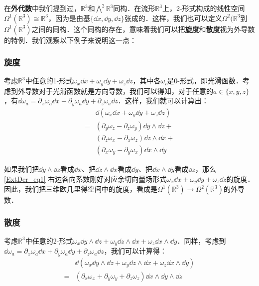 在\textbf{外代数}中我们提到过，$\mathbb{R}^3$和$\bigwedge^2\mathbb{R}^3$同构．在流形$\mathbb{R}^3$上，2-形式构成的线性空间$\Omega^1(\mathbb{R}^3)\cong\mathbb{R}^3$，因为是由基$\{\dd x, \dd y, \dd z\}$张成的．这样，我们也可以定义$\Omega^2(\mathbb{R}^3$到$\Omega^1(\mathbb{R}^3)$之间的同构．这个同构的存在，意味着我们可以把\textbf{旋度}和\textbf{散度}视为外导数的特例．我们观察以下例子来说明这一点：

\subsubsection{旋度}

考虑$\mathbb{R}^3$中任意的1-形式$\omega_x\dd x+\omega_y\dd y+\omega_z\dd z$，其中各$\omega_i$是0-形式，即光滑函数．考虑到外导数对于光滑函数就是方向导数，我们可以得知，对于任意的$a\in\{x,y,z\}$，有$\dd\omega_a=\partial_x\omega_a\dd x+\partial_y\omega_a\dd y+\partial_z\omega_a\dd z$．这样，我们就可以计算出：
\begin{equation}\label{ExtDer_eq1}
\begin{aligned}
&\dd(\omega_x\dd x+\omega_y\dd y+\omega_z\dd z)\\=&(\partial_y\omega_z-\partial_z\omega_y)\dd y\wedge\dd z+\\&(\partial_z\omega_x-\partial_x\omega_z)\dd z\wedge\dd x+\\&(\partial_x\omega_y-\partial_y\omega_x)\dd x\wedge\dd y
\end{aligned}
\end{equation}

如果我们把$\dd y\wedge\dd z$看成$\dd x$、把$\dd z\wedge\dd x$看成$\dd y$、把$\dd x\wedge\dd y$看成$\dd z$，那么\autoref{ExtDer_eq1} 右边各向系数刚好对应余切向量场形式$\omega_x\dd x+\omega_y\dd y+\omega_z\dd z$的旋度．因此，我们把三维欧几里得空间中的旋度，看成是$\Omega^1(\mathbb{R}^3)\rightarrow\Omega^2(\mathbb{R}^3)$的外导数．

\subsubsection{散度}

考虑$\mathbb{R}^3$中任意的2-形式$\omega_x\dd y\wedge\dd z+\omega_y\dd z\wedge\dd x+\omega_z\dd x\wedge\dd y$．同样，考虑到$\dd\omega_a=\partial_x\omega_a\dd x+\partial_y\omega_a\dd y+\partial_z\omega_a\dd z$，我们可以计算得：
\begin{equation}\label{ExtDer_eq2}
\begin{aligned}
&\dd(\omega_x\dd y\wedge\dd z+\omega_y\dd z\wedge\dd x+\omega_z\dd x\wedge\dd y)\\=&(\partial_x\omega_x+\partial_y\omega_y+\partial_z\omega_z)\dd x\wedge\dd y\wedge\dd z
\end{aligned}
\end{equation}

